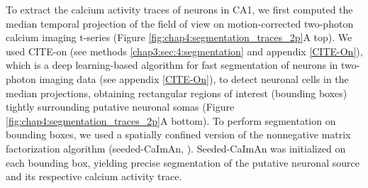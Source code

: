 To extract the calcium activity traces of neurons in CA1, we first computed the median  temporal projection of the field of view on motion-corrected two-photon calcium imaging t-series (Figure \ref{fig:chap4:segmentation_traces_2p}A top). 
We used CITE-on (see methods \ref{chap3:sec:4:segmentation} and appendix \ref{CITE-On}), which is a deep learning-based algorithm for fast segmentation of neurons in two-photon imaging data (see appendix \ref{CITE-On}), to detect neuronal cells in the median projections, obtaining rectangular regions of interest (bounding boxes) tightly surrounding putative neuronal somas (Figure \ref{fig:chap4:segmentation_traces_2p}A bottom). 
To perform segmentation on bounding boxes, we used a spatially confined version of the nonnegative matrix factorization algorithm (seeded-CaImAn, \cite{giovannucci2019}). 
Seeded-CaImAn was initialized on each bounding box, yielding precise segmentation of the putative neuronal source and its respective calcium activity trace.
